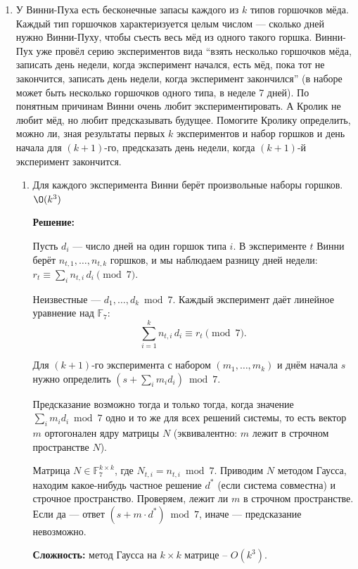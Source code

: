 \begin{enumerate}
    Решаем методом Гаусса: зелёный коридор возможен тогда и только тогда,
    когда система совместна.

    \textbf{Сложность:} построение $M$ -- для каждого $i$ проходим по $k_i + 1$ позициям,
    суммарно не более $O(n^2)$ операций (грубая оценка: $\sum k_i \le n^2$).
    Гаусс на $n \times n$ матрице над $\mathbb{F}_3$ --- $O(n^3)$.
    Итого $O(n^3)$.

  \item
    У Винни-Пуха есть бесконечные запасы каждого из $k$ типов горшочков мёда.
    Каждый тип горшочков характеризуется целым числом --- сколько дней нужно Винни-Пуху, чтобы съесть весь мёд из одного такого горшка.
    Винни-Пух уже провёл серию экспериментов вида ``взять несколько горшочков мёда, записать день недели, когда эксперимент начался, есть
    мёд, пока тот не закончится, записать день недели, когда эксперимент закончился'' (в наборе может быть несколько горшочков одного типа, в неделе 7 дней).
    По понятным причинам Винни очень любит экспериментировать. А Кролик не любит мёд, но любит предсказывать будущее. Помогите Кролику
    определить, можно ли, зная результаты первых $k$ экспериментов и набор горшков и день начала для $(k + 1)$-го,
    предсказать день недели, когда $(k + 1)$-й эксперимент закончится.
    
    \begin{enumerate}
      \item Для каждого эксперимента Винни берёт произвольные наборы горшков. $\O(k^3)$

      \textbf{Решение:}

      Пусть $d_i$ --- число дней на один горшок типа $i$.
      В эксперименте $t$ Винни берёт $n_{t,1}, \ldots, n_{t,k}$ горшков,
      и мы наблюдаем разницу дней недели: $r_t \equiv \sum_i n_{t,i}\, d_i \pmod{7}$.

      Неизвестные --- $d_1, \ldots, d_k \bmod 7$.
      Каждый эксперимент даёт линейное уравнение над $\mathbb{F}_7$:
      $$\sum_{i=1}^{k} n_{t,i}\, d_i \equiv r_t \pmod{7}.$$

      Для $(k{+}1)$-го эксперимента с набором $(m_1, \ldots, m_k)$ и днём начала $s$
      нужно определить \newline $\left(s + \sum_i m_i d_i\right) \bmod 7$.
      
      Предсказание возможно тогда и только тогда, когда значение $\sum_i m_i d_i \bmod 7$
      одно и то же для всех решений системы, то есть
      вектор $m$ ортогонален ядру матрицы $N$ (эквивалентно: $m$ лежит в строчном пространстве $N$).

      Матрица $N \in \mathbb{F}_7^{k \times k}$, где $N_{t,i} = n_{t,i} \bmod 7$.
      Приводим $N$ методом Гаусса, находим какое-нибудь частное решение $d^*$
      (если система совместна) и строчное пространство.
      Проверяем, лежит ли $m$ в строчном пространстве.
      Если да --- ответ $(s + m \cdot d^*) \bmod 7$, иначе --- предсказание невозможно.

      \textbf{Сложность:} метод Гаусса на $k \times k$ матрице -- $O(k^3)$.

    \end{enumerate}

\end{enumerate}
